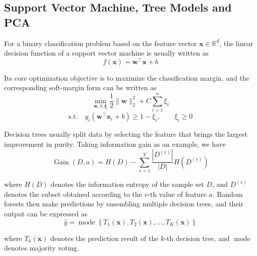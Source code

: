\subsection{Support Vector Machine, Tree Models and PCA}
\par For a binary classification problem based on the feature vector
$\mathbf{x}\in\mathbb{R}^d$, the linear decision function of a support vector
machine \cite{cortes1995support} is usually written as
\begin{equation}
    f(\mathbf{x})=\mathbf{w}^\top\mathbf{x}+b
    \label{eq:svm-decision-basic}
\end{equation}
\par Its core optimization objective is to maximize the classification margin,
and the corresponding soft-margin form can be written as
\begin{equation}
    \min_{\mathbf{w},b,\boldsymbol{\xi}}
    \frac{1}{2}\|\mathbf{w}\|_2^2+C\sum_{i=1}^{n}\xi_i
    \label{eq:svm-objective-basic}
\end{equation}
\begin{equation}
    \text{s.t.}\quad
    y_i(\mathbf{w}^\top\mathbf{x}_i+b)\ge 1-\xi_i,\qquad
    \xi_i\ge 0
    \label{eq:svm-constraint-basic}
\end{equation}
\par Decision trees \cite{breiman2017classification} usually split data by
selecting the feature that brings the largest improvement in purity. Taking
information gain as an example, we have
\begin{equation}
    \operatorname{Gain}(D,a)=H(D)-\sum_{v=1}^{V}\frac{|D^{(v)}|}{|D|}H(D^{(v)})
    \label{eq:info-gain-basic}
\end{equation}
\par where $H(D)$ denotes the information entropy of the sample set $D$, and
$D^{(v)}$ denotes the subset obtained according to the $v$-th value of feature
$a$. Random forests then make predictions by ensembling multiple decision
trees, and their output can be expressed as
\begin{equation}
    \hat{y}=\operatorname{mode}\left\{T_1(\mathbf{x}),T_2(\mathbf{x}),\ldots,T_K(\mathbf{x})\right\}
    \label{eq:random-forest-basic}
\end{equation}
\par where $T_k(\mathbf{x})$ denotes the prediction result of the $k$-th
decision tree, and $\operatorname{mode}$ denotes majority voting.

